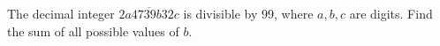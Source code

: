The decimal integer $\overline{2a4739b32c}$ is divisible by $99$, where $a,b,c$ are digits. Find the sum of all possible values of $b$.
